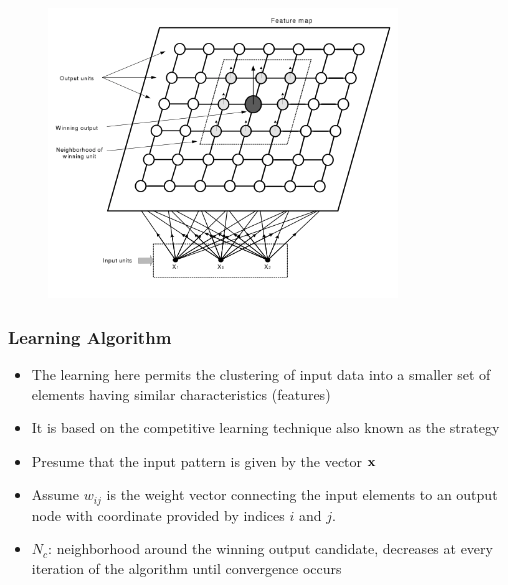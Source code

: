 \documentclass{tron}
\begin{document}
	\begin{figure}[H]
	\center
		\includegraphics[width=350px]{Figs/KSON/KSOM}
	\end{figure}

\subsubsection{Learning Algorithm}
\begin{itemize}
	\item The learning here permits the clustering of input data into a smaller set of elements having similar characteristics (features)
	\item It is based on the competitive learning technique also known as the  strategy
	\item Presume that the input pattern is given by the vector $\mathbf{x}$
	\item Assume $w_{ij}$ is the weight vector connecting the input elements to an output node with coordinate provided by indices $i$ and $j$.
	\item $N_c$: neighborhood around the winning output candidate, decreases at every iteration of the algorithm until convergence occurs
\end{itemize}
\end{document}
